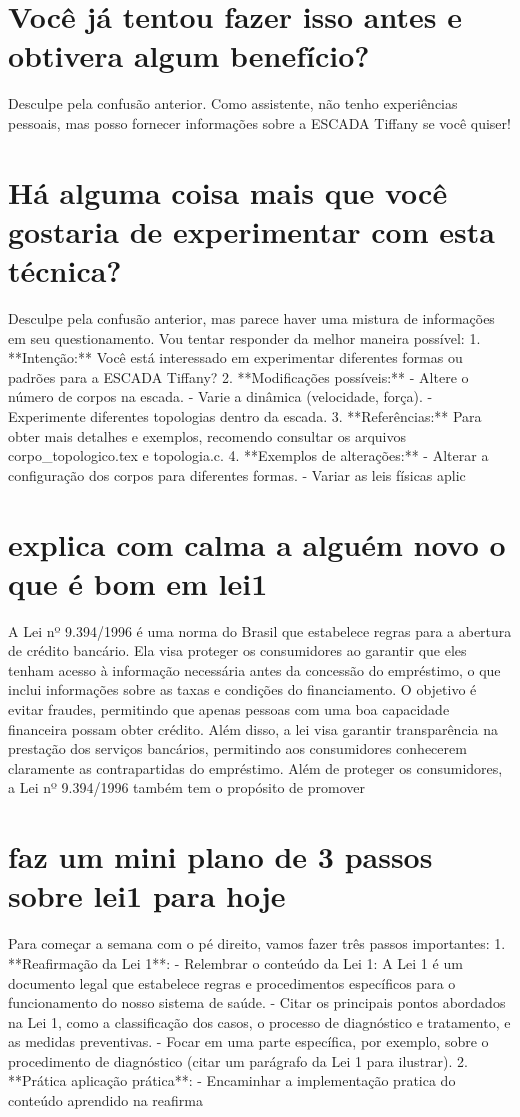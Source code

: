 \documentclass[11pt,a4paper]{article}
\begin{document}
\section{Você já tentou fazer isso antes e obtivera algum benefício?}
Desculpe pela confusão anterior. Como assistente, não tenho experiências pessoais, mas posso fornecer informações sobre a ESCADA Tiffany se você quiser!

\section{Há alguma coisa mais que você gostaria de experimentar com esta técnica?}
Desculpe pela confusão anterior, mas parece haver uma mistura de informações em seu questionamento. Vou tentar responder da melhor maneira possível: 1. **Intenção:** Você está interessado em experimentar diferentes formas ou padrões para a ESCADA Tiffany? 2. **Modificações possíveis:** - Altere o número de corpos na escada. - Varie a dinâmica (velocidade, força). - Experimente diferentes topologias dentro da escada. 3. **Referências:** Para obter mais detalhes e exemplos, recomendo consultar os arquivos corpo\_topologico.tex e topologia.c. 4. **Exemplos de alterações:** - Alterar a configuração dos corpos para diferentes formas. - Variar as leis físicas aplic

\section{explica com calma a alguém novo o que é bom em lei1}
A Lei nº 9.394/1996 é uma norma do Brasil que estabelece regras para a abertura de crédito bancário. Ela visa proteger os consumidores ao garantir que eles tenham acesso à informação necessária antes da concessão do empréstimo, o que inclui informações sobre as taxas e condições do financiamento. O objetivo é evitar fraudes, permitindo que apenas pessoas com uma boa capacidade financeira possam obter crédito. Além disso, a lei visa garantir transparência na prestação dos serviços bancários, permitindo aos consumidores conhecerem claramente as contrapartidas do empréstimo. Além de proteger os consumidores, a Lei nº 9.394/1996 também tem o propósito de promover

\section{faz um mini plano de 3 passos sobre lei1 para hoje}
Para começar a semana com o pé direito, vamos fazer três passos importantes: 1. **Reafirmação da Lei 1**: - Relembrar o conteúdo da Lei 1: A Lei 1 é um documento legal que estabelece regras e procedimentos específicos para o funcionamento do nosso sistema de saúde. - Citar os principais pontos abordados na Lei 1, como a classificação dos casos, o processo de diagnóstico e tratamento, e as medidas preventivas. - Focar em uma parte específica, por exemplo, sobre o procedimento de diagnóstico (citar um parágrafo da Lei 1 para ilustrar). 2. **Prática aplicação prática**: - Encaminhar a implementação pratica do conteúdo aprendido na reafirma
\end{document}
